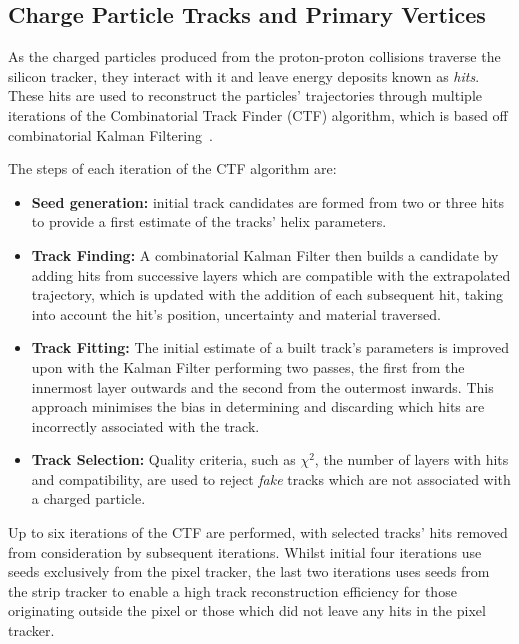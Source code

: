 {\subsection{Charge Particle Tracks and Primary Vertices}\label{subsec:tracksVertices}
As the charged particles produced from the proton-proton collisions traverse the silicon tracker, they interact with it and leave energy deposits known as \emph{hits}.
These hits are used to reconstruct the particles' trajectories through multiple iterations of the Combinatorial Track Finder (CTF) algorithm, which is based off combinatorial Kalman Filtering~\cite{Chatrchyan:2014fea,Fruhwirth:1987fm}.

The steps of each iteration	of the CTF algorithm are:
\begin{itemize}
\item \textbf{Seed generation:} initial track candidates are formed from two or three hits to provide a first estimate of the tracks' helix parameters.
\item \textbf{Track Finding:} A combinatorial Kalman Filter then builds a candidate by adding hits from successive layers which are compatible with the extrapolated trajectory, which is updated with the addition of each subsequent hit, taking into account the hit's position, uncertainty and material traversed.
\item \textbf{Track Fitting:} The initial estimate of a built track's parameters is improved upon with the Kalman Filter performing two passes, the first from the innermost layer outwards and the second from the outermost inwards.
This approach minimises the bias in determining and discarding which hits are incorrectly associated with the track.
\item \textbf{Track Selection:} Quality criteria, such as $\chi^{2}$, the number of layers with hits and compatibility, are used to reject \emph{fake} tracks which are not associated with a charged particle.
\end{itemize}

Up to six iterations of the CTF are performed, with selected tracks' hits removed from consideration by subsequent iterations.
Whilst initial four iterations use seeds exclusively from the pixel tracker, the last two iterations uses seeds from the strip tracker to enable a high track reconstruction efficiency for those originating outside the pixel or those which did not leave any hits in the pixel tracker.

}
